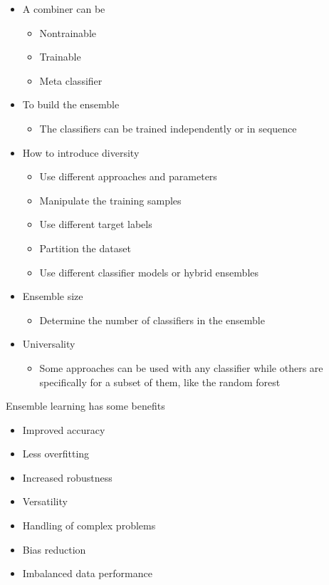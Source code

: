 \begin{itemize}
    \item A combiner can be
    \begin{itemize}
        \item Nontrainable
        \item Trainable
        \item Meta classifier
    \end{itemize}

    \item To build the ensemble
    \begin{itemize}
        \item The classifiers can be trained independently or in sequence
    \end{itemize}

    \item How to introduce diversity
    \begin{itemize}
        \item Use different approaches and parameters
        \item Manipulate the training samples
        \item Use different target labels
        \item Partition the dataset
        \item Use different classifier models or hybrid ensembles
    \end{itemize}

    \item Ensemble size
    \begin{itemize}
        \item Determine the number of classifiers in the ensemble
    \end{itemize}

    \item Universality
    \begin{itemize}
        \item Some approaches can be used with any classifier while others are specifically for a subset of them, like the random forest
    \end{itemize}
\end{itemize}

\vspace{10pt}

Ensemble learning has some benefits

\begin{itemize}
    \item Improved accuracy
    \item Less overfitting
    \item Increased robustness
    \item Versatility
    \item Handling of complex problems
    \item Bias reduction
    \item Imbalanced data performance
\end{itemize}


